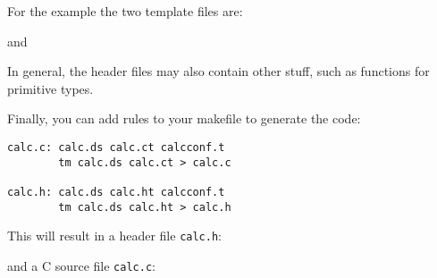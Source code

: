 For the example the two template files are:
\begin{showfile}
\end{showfile}
and
\begin{showfile}
\end{showfile}
In general, the header files may also contain other stuff,
such as functions for primitive types.

Finally, you can add rules to your makefile to generate the code:
\begin{showfile}
\begin{verbatim}
calc.c: calc.ds calc.ct calcconf.t
        tm calc.ds calc.ct > calc.c

calc.h: calc.ds calc.ht calcconf.t
        tm calc.ds calc.ht > calc.h
\end{verbatim}
\end{showfile}
This will result in a header file \verb'calc.h':
\begin{showfile}
\end{showfile}
and a C source file \verb'calc.c':
\begin{showfile}
\end{showfile}
